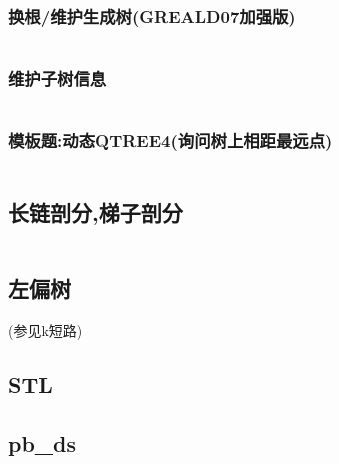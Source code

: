 \documentclass[a4paper]{article}
\begin{document}
\begin{multicols}{2}
					\subsubsection{换根/维护生成树(GREALD07加强版)}
						\inputminted{cpp}{../src/datastructure/GREALD07.cpp}

					\subsubsection{维护子树信息}
						\inputminted{cpp}{../src/datastructure/LCT维护子树信息.cpp}
					
					\subsubsection{模板题:动态QTREE4(询问树上相距最远点)}
						\inputminted{cpp}{../src/datastructure/动态QTREE4.cpp}







				\subsection{长链剖分,梯子剖分}
					\inputminted{cpp}{../src/datastructure/长链剖分.cpp}
				
				\subsection{左偏树}
					(参见k短路)

				\subsection{STL}


				\subsection{pb\_ds}



\end{multicols}
\end{document}

